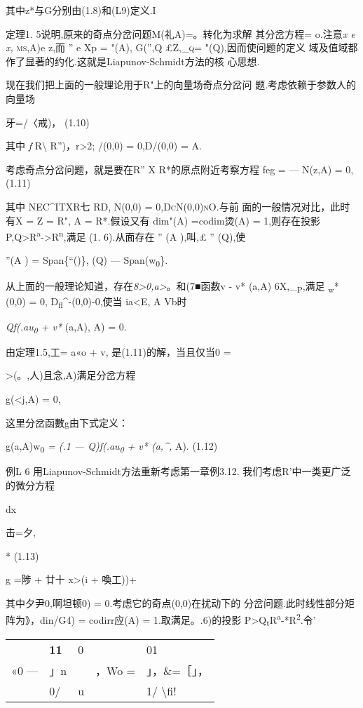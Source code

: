 \documentclass{article}
\begin{document}
其中z*与G分别由(1.8)和(L9)定义.I

定理1. 5说明,原来的奇点分岔问题M(礼A)=。转化为求解 其分岔方程=
o.注意\emph{x e x,} \textsc{ms,}A)e z,而 '' e Xp = "(A), G('',Q
\textsc{£Z,\_q=} "(Q),因而使问题的定义
域及值域都作了显著的约化.这就是Liapunov-Schmidt方法的核 心思想.

现在我们把上面的一般理论用于R"上的向量场奇点分岔问
题.考虑依赖于参数人的向量场

牙=/〈戒)， (1.10)

其中 \emph{f} R\textbackslash{} R'')，r\textgreater{}2; /(0,0) =
0,D/(0,0) = A.

考虑奇点分岔问题，就是要在R'' X R*的原点附近考察方程 feg = --- N(z,A) =
0, (1.11)

其中 NEC\^{}ITXR七 RD, \textsc{N(0,0) = 0,DcN(0,0)nO.}与前
面的一般情况对比，此时有X = Z = R", A = R*.假设又有 dim"(A) =codim烫(A)
= 1,则存在投影
P,Q\textgreater{}R\textsuperscript{a}-\textgreater{}R\textsuperscript{n},满足
(1. 6).从面存在 '' (A ),叫,£ '' (Q),使

''(A ) = Span\{``()\}, (Q) --- Span(w\textsubscript{0}\}.

从上面的一般理论知道，存在\emph{8\textgreater{}0,a\textgreater{}}。和(7■函数v
- v* (a,A) 6X,\_\textsubscript{P},满足 \textsubscript{w}*(0,0) = 0,
D\textsubscript{fl}\^{}-(0,0)-0,使当 ia\textbar{}\textless{}E,
\textbar{}A\textbar{} Vb时

\emph{Qf(.au\textsubscript{0} + v*} (a,A), A) = 0.

由定理1.5,工= a«o + v, 是(1.11)的解，当且仅当0 =

\textgreater{}(。,人)且念,A)满足分岔方程

g(\textless{}j,A) = 0,

这里分岔函數g由下式定义：

g(a,A)w\textsubscript{0} \emph{= (.1 --- Q)f(.au\textsubscript{0} + v*
(a,\^{},} A). (1.12)

例L 6 用Liapunov-Schmidt方法重新考虑第一章例3.12.
我们考虑R'中一类更广泛的微分方程

dx

击=夕,

* (1.13)

g =陟 + 廿十 x\textgreater{}(i + 喚工))+

其中夕尹0,啊坦顿0) = 0.考虑它的奇点(0,0)在扰动下的
分岔问题.此时线性部分矩阵为》，din/G4) = codirr应(A) =
1.取满足。.6)的投影
P\textgreater{}Q\textsubscript{t}R\textsuperscript{a}-*R\textsuperscript{2}.令'

\begin{longtable}[]{@{}lllll@{}}
\toprule
\endhead
& \textbf{11} & 0 & & 01\tabularnewline
«0 --- & 」n & & ，Wo = & 」，\&=［」，\tabularnewline
& 0/ & u & & 1/ \textbackslash{}fi!\tabularnewline
\bottomrule
\end{longtable}
\end{document}
